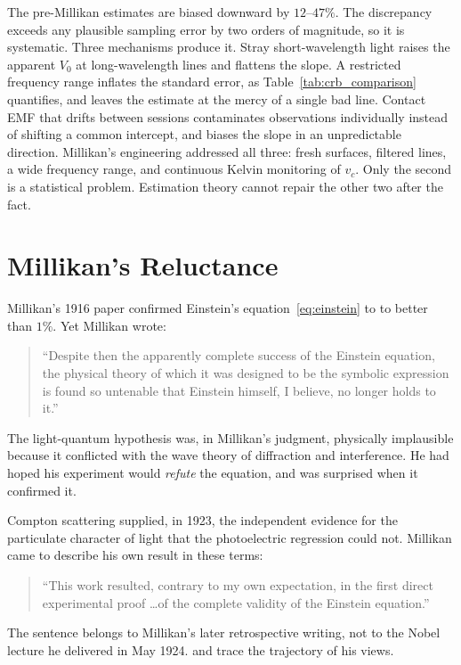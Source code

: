 \documentclass[12pt]{article}
\begin{document}
The pre-Millikan estimates are biased downward by $12$--$47\%$.  The
discrepancy exceeds any plausible sampling error by two orders of magnitude,
so it is systematic.  Three mechanisms produce it.  Stray short-wavelength
light raises the apparent $V_0$ at long-wavelength lines and flattens the
slope.  A restricted frequency range inflates the standard error, as
Table~\ref{tab:crb_comparison} quantifies, and leaves the estimate at the
mercy of a single bad line.  Contact EMF that drifts between sessions
contaminates observations individually instead of shifting a common intercept,
and biases the slope in an unpredictable direction.  Millikan's engineering
addressed all three: fresh surfaces, filtered lines, a wide frequency range,
and continuous Kelvin monitoring of $v_c$.  Only the second is a statistical
problem.  Estimation theory cannot repair the other two after the fact.

\section{Millikan's Reluctance}
\label{sec:millikan_reluctance}

Millikan's 1916 paper confirmed Einstein's equation~\eqref{eq:einstein} to
to better than $1\%$.  Yet Millikan wrote:
\begin{quote}
  ``Despite then the apparently complete success of the Einstein equation,
  the physical theory of which it was designed to be the symbolic expression
  is found so untenable that Einstein himself, I believe, no longer holds
  to it.'' \citep[p.\ 388]{Millikan1916}
\end{quote}
The light-quantum hypothesis was, in Millikan's judgment, physically
implausible because it conflicted with the wave theory of diffraction and
interference.  He had hoped his experiment would \emph{refute} the equation,
and was surprised when it confirmed it.

Compton scattering \citep{Compton1923} supplied, in 1923, the independent
evidence for the particulate character of light that the photoelectric
regression could not.  Millikan came to describe his own result in these
terms:
\begin{quote}
  ``This work resulted, contrary to my own expectation, in the first direct
  experimental proof \ldots of the complete validity of the Einstein
  equation.''
\end{quote}
\noindent The sentence belongs to Millikan's later retrospective writing, not
to the Nobel lecture he delivered in May 1924.  \citet{Holton1999} and
\citet{Pais1982} trace the trajectory of his views.
\end{document}
